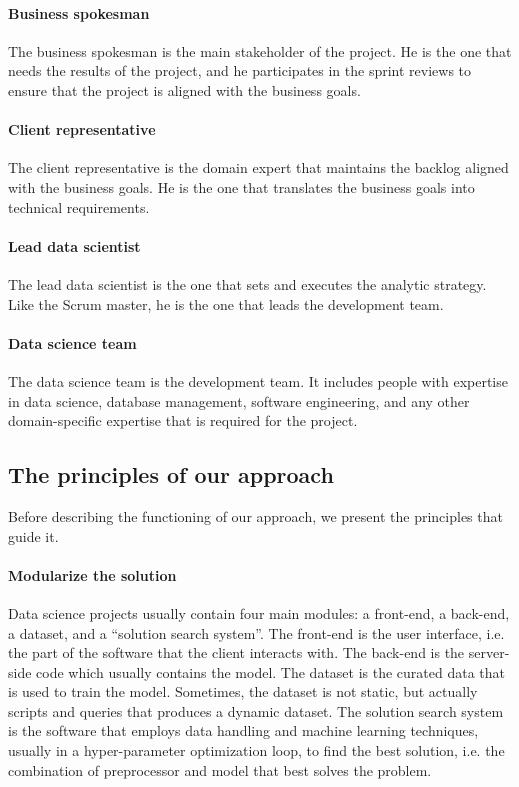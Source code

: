 
\paragraph{Business spokesman}  The business spokesman is the main stakeholder of the project.
He is the one that needs the results of the project, and he participates in the sprint
reviews to ensure that the project is aligned with the business goals.

\paragraph{Client representative}  The client representative is the domain expert that
maintains the backlog aligned with the business goals.  He is the one that translates the
business goals into technical requirements.

\paragraph{Lead data scientist}  The lead data scientist is the one that sets and executes
the analytic strategy.  Like the Scrum master, he is the one that leads the development
team.

\paragraph{Data science team}  The data science team is the development team.  It includes
people with expertise in data science, database management, software engineering, and any
other domain-specific expertise that is required for the project.

\subsection{The principles of our approach}

Before describing the functioning of our approach, we present the principles that guide it.

\paragraph{Modularize the solution}

Data science projects usually contain four main modules: a front-end, a back-end, a
dataset, and a ``solution search system''.  The front-end is the user interface, i.e.
the part of the software that the client interacts with.  The back-end is the server-side
code which usually contains the model.  The dataset is the curated data that is used to train the
model.  Sometimes, the dataset is not static, but actually scripts and queries that
produces a dynamic dataset.  The solution search system is the software that employs data
handling and machine learning techniques, usually in a hyper-parameter optimization loop,
to find the best solution, i.e. the combination of preprocessor and model that best
solves the problem.

